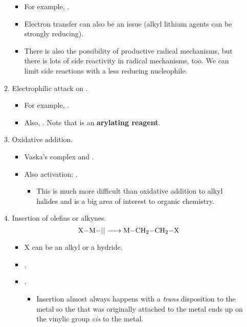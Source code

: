 \documentclass[../notes.tex]{subfiles}
\begin{document}
\begin{itemize}
\begin{enumerate}
        \begin{itemize}
            \item For example, .
            \item Electron transfer can also be an issue (alkyl lithium agents can be strongly reducing).
            \item There is also the possibility of productive radical mechanisms, but there is lots of side reactivity in radical mechanisms, too. We can limit side reactions with a less reducing nucleophile.
        \end{itemize}
        \item Electrophilic attack on .
        \begin{itemize}
            \item For example, .
            \item Also, . Note that  is an \textbf{arylating reagent}.
        \end{itemize}
        \item Oxidative addition.
        \begin{itemize}
            \item Vaska's complex and .
            \item Also  activation: .
            \begin{itemize}
                \item This is much more difficult than oxidative addition to alkyl halides and is a big area of interest to organic chemistry.
            \end{itemize}
        \end{itemize}
        \item Insertion of olefins or alkynes.
        \begin{equation*}
            \ce{X-M-|| -> M-CH2-CH2-X}
        \end{equation*}
        \begin{itemize}
            \item X can be an alkyl or a hydride.
            \item {}.
            \item {}.
            \begin{itemize}
                \item Insertion almost always happens with a \emph{trans} disposition to the metal so the  that was originally attached to the metal ends up on the vinylic group \emph{cis} to the metal.

\end{itemize}
\end{itemize}
\end{enumerate}
\end{itemize}
\end{document}
